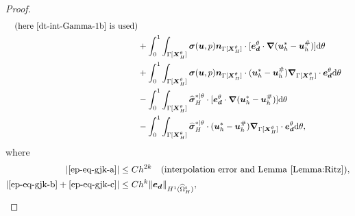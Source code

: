 \documentclass[11pt,reqno]{amsart}
\theoremstyle{definition}
\theoremstyle{plain}
\numberwithin{theorem}{section}
\numberwithin{proposition}{section}
\numberwithin{lemma}{section}
\numberwithin{equation}{section}
\newcommand{\bs}[1]{\boldsymbol{#1}}
\newcommand{\uu}[1]  {{\bs{#1}} }
\newcommand{\grad}   { \uu{\nabla}    }
\def\d{\mathrm{d}}
\renewcommand{\(}{\bigl(}
\renewcommand{\)}{\bigr)}
\begin{document}
\begin{proof}
\begin{subequations}
\begin{align}
  \quad\mbox{(here \eqref{dt-int-Gamma-1b} is used)}\\
  & + \int_0^1\int_{\Gamma[\bs X_H^\theta]} {\bs \sigma}({\bs u},p){\bs n}_{\Gamma[{\bs X}_H^\theta]} \cdot [{\bs e}_{\bs d}^\theta\cdot\grad({\bs u}_h^*-{\bs u}_h^\#)] \d\theta \label{ep-eq-gjk-e}\\
  & + \int_0^1\int_{\Gamma[\bs X_H^\theta]} {\bs \sigma}({\bs u},p){\bs n}_{\Gamma[{\bs X}_H^\theta]} \cdot ({\bs u}_h^*-{\bs u}_h^\#) \grad_{\Gamma[\bs X_H^\theta]}\cdot {\bs e}_{\bs d}^\theta \d\theta \label{ep-eq-gjk-f}\\
  & - \int_0^1\int_{\Gamma[{\bs X}_H^\theta]} {\widehat{\bs\sigma}}_H^{*|\theta} \cdot [{\bs e}_{\bs d}^\theta\cdot\grad({\bs u}_h^*-{\bs u}_h^\#)] \d\theta \label{ep-eq-gjk-g}\\
  & - \int_0^1\int_{\Gamma[{\bs X}_H^\theta]} {\widehat{\bs\sigma}}_H^{*|\theta} \cdot ({\bs u}_h^*-{\bs u}_h^\#) \grad_{\Gamma[\bs X_H^\theta]}\cdot {\bs e}_{\bs d}^\theta \d\theta , \label{ep-eq-gjk-h} 
\end{align}
\end{subequations}
where 
\begin{align*}
|\eqref{ep-eq-gjk-a}| &\le Ch^{2k} \quad\mbox{(interpolation error and Lemma \ref{Lemma:Ritz})},\\ 
|\eqref{ep-eq-gjk-b}+\eqref{ep-eq-gjk-c}| &\le Ch^{k} \|{\bs e}_{\bs d}\|_{H^1(\widehat{\Omega}_H^{\rm s})} ,
\end{align*}


\end{proof}
\end{document}
